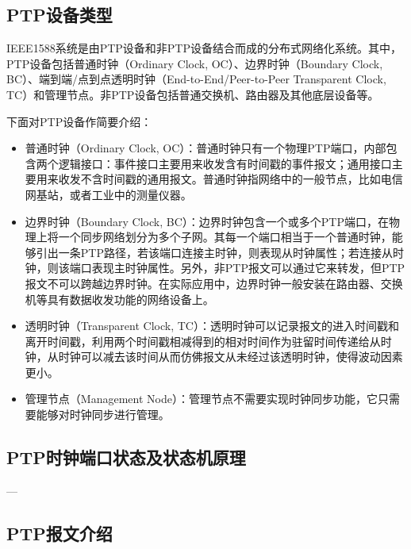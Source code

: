 \subsection{PTP设备类型}
IEEE1588系统是由PTP设备和非PTP设备结合而成的分布式网络化系统。其中，PTP设备包括普通时钟（Ordinary Clock, OC）、边界时钟（Boundary Clock, BC）、端到端/点到点透明时钟（End-to-End/Peer-to-Peer Transparent Clock, TC）和管理节点。非PTP设备包括普通交换机、路由器及其他底层设备等。

下面对PTP设备作简要介绍：
\begin{itemize}[noitemsep,topsep=0pt,parsep=0pt,partopsep=0pt]
	\item 普通时钟（Ordinary Clock, OC）：普通时钟只有一个物理PTP端口，内部包含两个逻辑接口：事件接口主要用来收发含有时间戳的事件报文；通用接口主要用来收发不含时间戳的通用报文。普通时钟指网络中的一般节点，比如电信网基站，或者工业中的测量仪器。
	\item 边界时钟（Boundary Clock, BC）：边界时钟包含一个或多个PTP端口，在物理上将一个同步网络划分为多个子网。其每一个端口相当于一个普通时钟，能够引出一条PTP路径，若该端口连接主时钟，则表现从时钟属性；若连接从时钟，则该端口表现主时钟属性。另外，非PTP报文可以通过它来转发，但PTP报文不可以跨越边界时钟。在实际应用中，边界时钟一般安装在路由器、交换机等具有数据收发功能的网络设备上。
	\item 透明时钟（Transparent Clock, TC）：透明时钟可以记录报文的进入时间戳和离开时间戳，利用两个时间戳相减得到的相对时间作为驻留时间传递给从时钟，从时钟可以减去该时间从而仿佛报文从未经过该透明时钟，使得波动因素更小。
	\item 管理节点（Management Node）：管理节点不需要实现时钟同步功能，它只需要能够对时钟同步进行管理。
\end{itemize}

\subsection{PTP时钟端口状态及状态机原理}
---
\subsection{PTP报文介绍}
